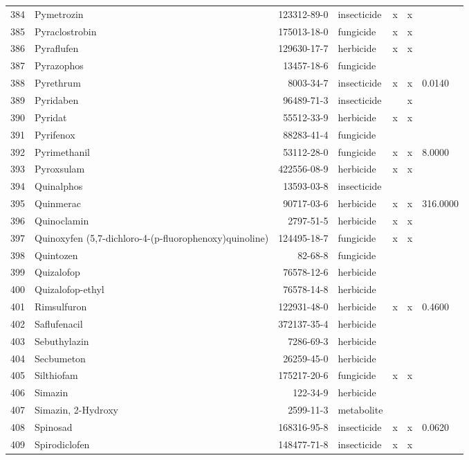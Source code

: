 \begin{longtable}{lp{4cm}rlp{1.3cm}p{1.3cm}p{1.5cm}}
  384 & Pymetrozin & 123312-89-0 & insecticide & x & x &  \\ 
  385 & Pyraclostrobin & 175013-18-0 & fungicide & x & x &  \\ 
  386 & Pyraflufen & 129630-17-7 & herbicide & x & x &  \\ 
  387 & Pyrazophos & 13457-18-6 & fungicide &  &  &  \\ 
  388 & Pyrethrum & 8003-34-7 & insecticide & x & x & 0.0140 \\ 
  389 & Pyridaben & 96489-71-3 & insecticide &  & x &  \\ 
  390 & Pyridat & 55512-33-9 & herbicide & x & x &  \\ 
  391 & Pyrifenox & 88283-41-4 & fungicide &  &  &  \\ 
  392 & Pyrimethanil & 53112-28-0 & fungicide & x & x & 8.0000 \\ 
  393 & Pyroxsulam & 422556-08-9 & herbicide & x & x &  \\ 
  394 & Quinalphos & 13593-03-8 & insecticide &  &  &  \\ 
  395 & Quinmerac & 90717-03-6 & herbicide & x & x & 316.0000 \\ 
  396 & Quinoclamin & 2797-51-5 & herbicide & x & x &  \\ 
  397 & Quinoxyfen (5,7-dichloro-4-(p-fluorophenoxy)quinoline) & 124495-18-7 & fungicide & x & x &  \\ 
  398 & Quintozen & 82-68-8 & fungicide &  &  &  \\ 
  399 & Quizalofop & 76578-12-6 & herbicide &  &  &  \\ 
  400 & Quizalofop-ethyl & 76578-14-8 & herbicide &  &  &  \\ 
  401 & Rimsulfuron & 122931-48-0 & herbicide & x & x & 0.4600 \\ 
  402 & Saflufenacil & 372137-35-4 & herbicide &  &  &  \\ 
  403 & Sebuthylazin & 7286-69-3 & herbicide &  &  &  \\ 
  404 & Secbumeton & 26259-45-0 & herbicide &  &  &  \\ 
  405 & Silthiofam & 175217-20-6 & fungicide & x & x &  \\ 
  406 & Simazin & 122-34-9 & herbicide &  &  &  \\ 
  407 & Simazin, 2-Hydroxy & 2599-11-3 & metabolite &  &  &  \\ 
  408 & Spinosad & 168316-95-8 & insecticide & x & x & 0.0620 \\ 
  409 & Spirodiclofen & 148477-71-8 & insecticide & x & x &  \\ 

\end{longtable}

